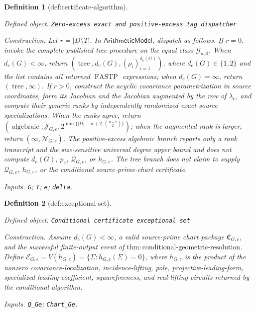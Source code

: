 \documentclass{article}
\newtheorem{definition}{Definition}
\begin{document}
\begin{definition}[def:certificate-algorithm]\label{def:certificate-algorithm}
\par\smallskip\noindent\emph{Defined object.} \texttt{Zero-\allowbreak{}excess exact and positive-\allowbreak{}excess tag dispatcher}
\par\smallskip\noindent\emph{Construction.} Let \(r=|D\setminus T|\). In \(\mathsf{ArithmeticModel}\), dispatch as follows. If \(r=0\), invoke the complete published tree procedure on the equal class \(\mathcal G_{n,0}\). When \(d_e(G)<\infty\), return \((\operatorname{tree},d_e(G),(\rho_i)_{i=1}^{d_e(G)})\), where \(d_e(G)\in\{1,2\}\) and the list contains all returned \(\operatorname{FASTP}\) expressions; when \(d_e(G)=\infty\), return \((\operatorname{tree},\infty)\). If \(r>0\), construct the acyclic covariance parametrization in source coordinates, form its Jacobian and the Jacobian augmented by the row of \(\lambda_e\), and compute their generic ranks by independently randomized exact source specializations. When the ranks agree, return \((\operatorname{algebraic},\mathcal J_{G,e},2^{\min\{|D|-n+2,\binom{n-2}{2}\}})\); when the augmented rank is larger, return \((\infty,\mathcal N_{G,e})\). The positive-excess algebraic branch reports only a rank transcript and the size-sensitive universal degree upper bound and does not compute \(d_e(G)\), \(p_e\), \(\mathcal Q_{G,e}\), or \(h_{G,e}\). The tree branch does not claim to supply \(\mathcal Q_{G,e}\), \(h_{G,e}\), or the conditional source-prime-chart certificate.
\par\smallskip\noindent\emph{Inputs.} \texttt{G}; \texttt{T}; \texttt{e}; \texttt{delta}.
\end{definition}

\begin{definition}[def:exceptional-set]\label{def:exceptional-set}
\par\smallskip\noindent\emph{Defined object.} \texttt{Conditional certificate exceptional set}
\par\smallskip\noindent\emph{Construction.} Assume \(d_e(G)<\infty\), a valid source-prime chart package \(\mathfrak C_{G,e}\), and the successful finite-output event of \(\mathrm{thm:conditional\mbox{-}geometric\mbox{-}resolution}\). Define \(\mathcal E_{G,e}=V(h_{G,e})=\{\Sigma:h_{G,e}(\Sigma)=0\}\), where \(h_{G,e}\) is the product of the nonzero covariance-localization, incidence-lifting, pole, projective-leading-form, specialized-leading-coefficient, squarefreeness, and real-lifting circuits returned by the conditional algorithm.
\par\smallskip\noindent\emph{Inputs.} \texttt{Q\_\allowbreak{}Ge}; \texttt{Chart\_\allowbreak{}Ge}.
\end{definition}
\end{document}

